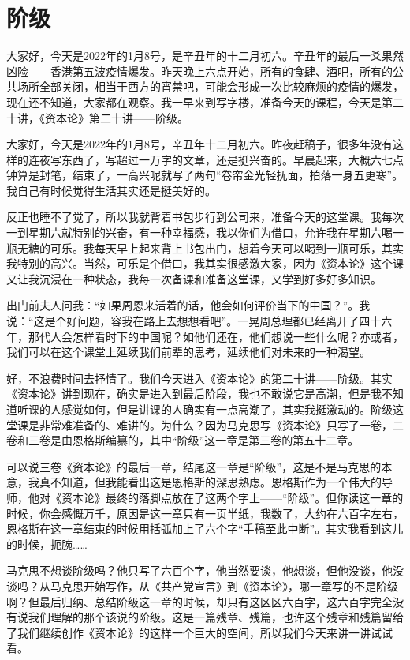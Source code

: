 \documentclass[UTF8, 12pt, a4paper]{ctexrep}
\begin{document}
\section{阶级}

大家好，今天是2022年的1月8号，是辛丑年的十二月初六。辛丑年的最后一爻果然凶险——香港第五波疫情爆发。昨天晚上六点开始，所有的食肆、酒吧，所有的公共场所全部关闭，相当于西方的宵禁吧，可能会形成一次比较麻烦的疫情的爆发，现在还不知道，大家都在观察。我一早来到写字楼，准备今天的课程，今天是第二十讲，《资本论》第二十讲——阶级。

大家好，今天是2022年的1月8号，辛丑年十二月初六。昨夜赶稿子，很多年没有这样的连夜写东西了，写超过一万字的文章，还是挺兴奋的。早晨起来，大概六七点钟算是封笔，结束了，一高兴呢就写了两句“卷帘金光轻抚面，拍落一身五更寒”。我自己有时候觉得生活其实还是挺美好的。

反正也睡不了觉了，所以我就背着书包步行到公司来，准备今天的这堂课。我每次一到星期六就特别的兴奋，有一种幸福感，我以你们为借口，允许我在星期六喝一瓶无糖的可乐。我每天早上起来背上书包出门，想着今天可以喝到一瓶可乐，其实我特别的高兴。当然，可乐是个借口，我其实很感激大家，因为《资本论》这个课又让我沉浸在一种状态，我每一次备课和准备这堂课，又学到好多好多知识。

出门前夫人问我：“如果周恩来活着的话，他会如何评价当下的中国？”。我说：“这是个好问题，容我在路上去想想看吧”。一晃周总理都已经离开了四十六年，那代人会怎样看时下的中国呢？如他们还在，他们想说一些什么呢？亦或者，我们可以在这个课堂上延续我们前辈的思考，延续他们对未来的一种渴望。

好，不浪费时间去抒情了。我们今天进入《资本论》的第二十讲——阶级。其实《资本论》讲到现在，确实是进入到最后阶段，我也不敢说它是高潮，但是我不知道听课的人感觉如何，但是讲课的人确实有一点高潮了，其实我挺激动的。阶级这堂课是非常难准备的、难讲的。为什么？因为马克思写《资本论》只写了一卷，二卷和三卷是由恩格斯编纂的，其中“阶级”这一章是第三卷的第五十二章。

可以说三卷《资本论》的最后一章，结尾这一章是“阶级”，这是不是马克思的本意，我真不知道，但我能看出这是恩格斯的深思熟虑。恩格斯作为一个伟大的导师，他对《资本论》最终的落脚点放在了这两个字上——“阶级”。但你读这一章的时候，你会感慨万千，原因是这一章只有一页半纸，我数了，大约在六百字左右，恩格斯在这一章结束的时候用括弧加上了六个字“手稿至此中断”。其实我看到这儿的时候，扼腕……

马克思不想谈阶级吗？他只写了六百个字，他当然要谈，他想谈，但他没谈，他没谈吗？从马克思开始写作，从《共产党宣言》到《资本论》，哪一章写的不是阶级啊？但最后归纳、总结阶级这一章的时候，却只有这区区六百字，这六百字完全没有说我们理解的那个该说的阶级。这是一篇残章、残篇，也许这个残章和残篇留给了我们继续创作《资本论》的这样一个巨大的空间，所以我们今天来讲一讲试试看。
\end{document}
